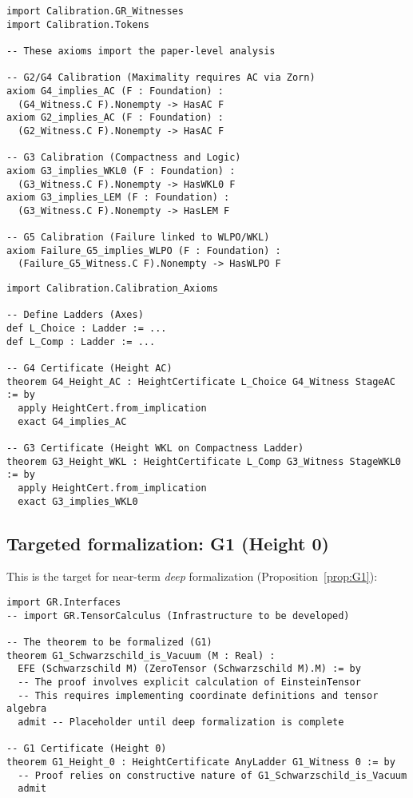\documentclass[11pt]{article}
\theoremstyle{definition}
\theoremstyle{remark}
\begin{document}
\begin{lstlisting}[caption={Calibration/Calibration\_Axioms.lean}]
import Calibration.GR_Witnesses
import Calibration.Tokens

-- These axioms import the paper-level analysis

-- G2/G4 Calibration (Maximality requires AC via Zorn)
axiom G4_implies_AC (F : Foundation) : 
  (G4_Witness.C F).Nonempty -> HasAC F
axiom G2_implies_AC (F : Foundation) : 
  (G2_Witness.C F).Nonempty -> HasAC F

-- G3 Calibration (Compactness and Logic)
axiom G3_implies_WKL0 (F : Foundation) : 
  (G3_Witness.C F).Nonempty -> HasWKL0 F
axiom G3_implies_LEM (F : Foundation) : 
  (G3_Witness.C F).Nonempty -> HasLEM F

-- G5 Calibration (Failure linked to WLPO/WKL)
axiom Failure_G5_implies_WLPO (F : Foundation) : 
  (Failure_G5_Witness.C F).Nonempty -> HasWLPO F
\end{lstlisting}

\begin{lstlisting}[caption={Calibration/GR\_Certificates.lean}]
import Calibration.Calibration_Axioms

-- Define Ladders (Axes)
def L_Choice : Ladder := ...
def L_Comp : Ladder := ...

-- G4 Certificate (Height AC)
theorem G4_Height_AC : HeightCertificate L_Choice G4_Witness StageAC := by
  apply HeightCert.from_implication
  exact G4_implies_AC

-- G3 Certificate (Height WKL on Compactness Ladder)
theorem G3_Height_WKL : HeightCertificate L_Comp G3_Witness StageWKL0 := by
  apply HeightCert.from_implication
  exact G3_implies_WKL0
\end{lstlisting}

\subsection{Targeted formalization: G1 (Height 0)}

This is the target for near-term \emph{deep} formalization (Proposition~\ref{prop:G1}):

\begin{lstlisting}[caption={GR/Height0/Schwarzschild.lean}]
import GR.Interfaces
-- import GR.TensorCalculus (Infrastructure to be developed)

-- The theorem to be formalized (G1)
theorem G1_Schwarzschild_is_Vacuum (M : Real) :
  EFE (Schwarzschild M) (ZeroTensor (Schwarzschild M).M) := by
  -- The proof involves explicit calculation of EinsteinTensor
  -- This requires implementing coordinate definitions and tensor algebra
  admit -- Placeholder until deep formalization is complete

-- G1 Certificate (Height 0)
theorem G1_Height_0 : HeightCertificate AnyLadder G1_Witness 0 := by
  -- Proof relies on constructive nature of G1_Schwarzschild_is_Vacuum
  admit
\end{lstlisting}
\end{document}
